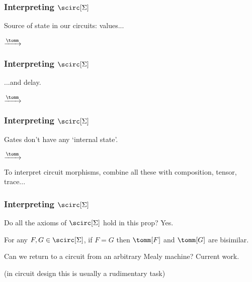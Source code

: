 \begin{frame}
    \frametitle{Interpreting $\scirc[\Sigma]$}    

    Source of \alert{state} in our circuits: \alert{values}...

    \pause

    \begin{center}
        \qquad
        \pause
        $\xrightarrow{\tomm}$
        \qquad
        \raisebox{-1.25em}{}
    \end{center}
\end{frame}

\begin{frame}
    \frametitle{Interpreting $\scirc[\Sigma]$}    
    ...and \alert{delay}.

    \pause
    \begin{center}
        \qquad
        \pause
        $\xrightarrow{\tomm}$
        \qquad
        \raisebox{-8em}{}
    \end{center}
\end{frame}


\begin{frame}
    \frametitle{Interpreting $\scirc[\Sigma]$}

    Gates don't have any `internal state'.

    \pause

    \begin{center}
        \qquad
        \pause
        $\xrightarrow{\tomm}$
        \qquad
        \raisebox{-1em}{}
    \end{center}

    \pause

    To interpret circuit morphisms, combine all these with composition, tensor, trace...

\end{frame}


\begin{frame}
    \frametitle{Interpreting $\scirc[\Sigma]$}

    Do all the axioms of $\scirc[\Sigma]$ hold in this prop? \pause \alert{Yes.}

    \pause

    \begin{theorem}
        For any $F,G \in \scirc[\Sigma]$, if $F = G$ then $\tomm[F]$ and $\tomm[G]$ are bisimilar.
    \end{theorem}

    \pause

    Can we return to a circuit from an arbitrary Mealy machine? \pause \alert{Current work}.

    \pause

    (in circuit design this is usually a rudimentary task)

\end{frame}

